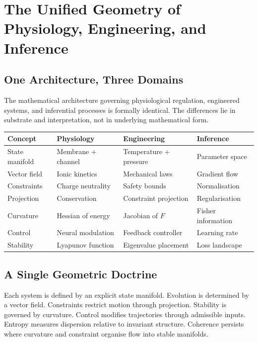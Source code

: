 \documentclass[12pt,openany]{book}
\begin{document}
\chapter{The Unified Geometry of Physiology, Engineering, and Inference}
\label{ch:unified}

\section{One Architecture, Three Domains}

The mathematical architecture governing physiological regulation, engineered
systems, and inferential processes is formally identical. The differences lie in
substrate and interpretation, not in underlying mathematical form.

\begin{center}
\begin{tabular}{@{}llll@{}}
  \toprule
  \textbf{Concept} & \textbf{Physiology} & \textbf{Engineering} &
  \textbf{Inference} \\
  \midrule
  State manifold & Membrane + channel & Temperature + pressure & Parameter space \\
  Vector field & Ionic kinetics & Mechanical laws & Gradient flow \\
  Constraints & Charge neutrality & Safety bounds & Normalisation \\
  Projection & Conservation & Constraint projection & Regularisation \\
  Curvature & Hessian of energy & Jacobian of $F$ & Fisher information \\
  Control & Neural modulation & Feedback controller & Learning rate \\
  Stability & Lyapunov function & Eigenvalue placement & Loss landscape \\
  \bottomrule
\end{tabular}
\end{center}

\section{A Single Geometric Doctrine}

Each system is defined by an explicit state manifold. Evolution is determined by
a vector field. Constraints restrict motion through projection. Stability is
governed by curvature. Control modifies trajectories through admissible inputs.
Entropy measures dispersion relative to invariant structure. Coherence persists
where curvature and constraint organise flow into stable manifolds.
\end{document}
